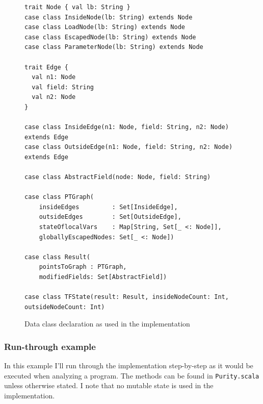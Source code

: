 \documentclass[11pt]{exam}
\begin{document}
\begin{figure}[t]
\begin{lstlisting}
trait Node { val lb: String }
case class InsideNode(lb: String) extends Node
case class LoadNode(lb: String) extends Node
case class EscapedNode(lb: String) extends Node
case class ParameterNode(lb: String) extends Node

trait Edge {
  val n1: Node
  val field: String
  val n2: Node
}

case class InsideEdge(n1: Node, field: String, n2: Node) extends Edge
case class OutsideEdge(n1: Node, field: String, n2: Node) extends Edge

case class AbstractField(node: Node, field: String)

case class PTGraph(
    insideEdges         : Set[InsideEdge],
    outsideEdges        : Set[OutsideEdge],
    stateOflocalVars    : Map[String, Set[_ <: Node]],
    globallyEscapedNodes: Set[_ <: Node])

case class Result(
    pointsToGraph : PTGraph,
    modifiedFields: Set[AbstractField])

case class TFState(result: Result, insideNodeCount: Int, outsideNodeCount: Int)
\end{lstlisting}
\caption{Data class declaration as used in the implementation}
\label{code-data}
\end{figure}

\subsubsection*{Run-through example}

In this example I'll run through the implementation step-by-step as it
would be executed when analyzing a program. The methods can be found
in \texttt{Purity.scala} unless otherwise stated. I note that no mutable
state is used in the implementation. \newline
\end{document}
